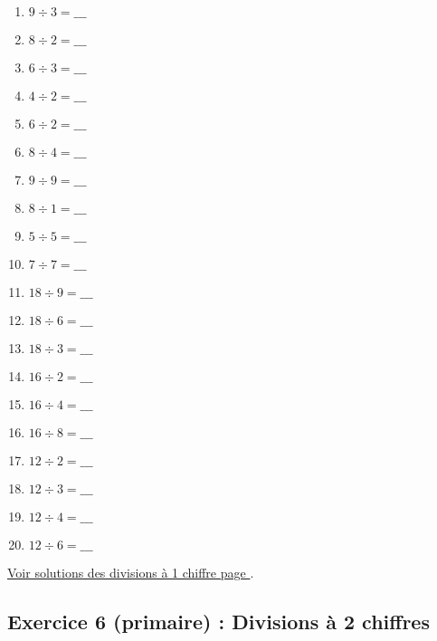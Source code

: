\begin{enumerate}[label=C\arabic*)]
    \item \(9 \div 3 =  \_\_\_\)
    \item \(8 \div 2 = \_\_\_\)
    \item \(6 \div 3 = \_\_\_\)
    \item \(4 \div 2 = \_\_\_\)
    \item \(6 \div 2 = \_\_\_\)
    \item \(8 \div 4 = \_\_\_\)
    \item \(9 \div 9 = \_\_\_\)
    \item \(8 \div 1 = \_\_\_\)
    \item \(5 \div 5 = \_\_\_\)
    \item \(7 \div 7 = \_\_\_\)
    \item \(18 \div 9 =  \_\_\_\)
    \item \(18 \div 6 = \_\_\_\)
    \item \(18 \div 3 = \_\_\_\)
    \item \(16 \div 2 = \_\_\_\)
    \item \(16 \div 4 = \_\_\_\)
    \item \(16 \div 8 = \_\_\_\)
    \item \(12 \div 2 = \_\_\_\)
    \item \(12 \div 3 = \_\_\_\)
    \item \(12 \div 4 = \_\_\_\)
    \item \(12 \div 6 = \_\_\_\)
\end{enumerate}

\hyperref[sol:niveau5]{Voir solutions des divisions à 1 chiffre page \pageref{sol:niveau5}}.

\newpage


\subsection{Exercice 6 (primaire) : Divisions à 2 chiffres}


\label{calc:niveau6}

